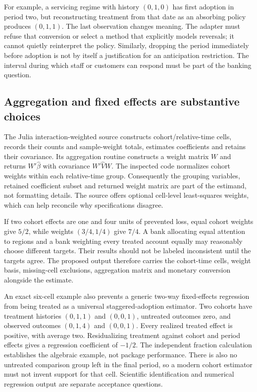 For example, a servicing regime with history $(0,1,0)$ has first adoption in
period two, but reconstructing treatment from that date as an absorbing policy
produces $(0,1,1)$. The last observation changes meaning. The adapter must
refuse that conversion or select a method that explicitly models reversals;
it cannot quietly reinterpret the policy. Similarly, dropping the period
immediately before adoption is not by itself a justification for an
anticipation restriction. The interval during which staff or customers
can respond must be part of the banking question.\citep{exec25_panelother_choice}

\subsection{Aggregation and fixed effects are substantive choices}
The Julia interaction-weighted source constructs cohort/relative-time cells,
records their counts and sample-weight totals, estimates coefficients and
retains their covariance. Its aggregation routine constructs a weight matrix
$W$ and returns $W'\widehat\beta$ with covariance $W'\widehat V W$.
The inspected code normalizes cohort weights within each relative-time group.
Consequently the grouping variables, retained coefficient subset and returned
weight matrix are part of the estimand, not formatting details. The source
offers optional cell-level least-squares weights, which can help reconcile
why specifications disagree.\citep{exec25_panelother_julia}

If two cohort effects are one and four units of prevented loss, equal cohort
weights give $5/2$, while weights $(3/4,1/4)$ give $7/4$. A bank allocating
equal attention to regions and a bank weighting every treated account equally
may reasonably choose different targets. Their results should not be labeled
inconsistent until the targets agree. The proposed output therefore carries
the cohort-time cells, weight basis, missing-cell exclusions, aggregation
matrix and monetary conversion alongside the estimate.\citep{exec25_panelother_choice}

An exact six-cell example also prevents a generic two-way fixed-effects
regression from being treated as a universal staggered-adoption estimator.
Two cohorts have treatment histories $(0,1,1)$ and $(0,0,1)$, untreated
outcomes zero, and observed outcomes $(0,1,4)$ and $(0,0,1)$. Every realized
treated effect is positive, with average two. Residualizing treatment against
cohort and period effects gives a regression coefficient of $-1/2$.
The independent fraction calculation establishes the algebraic example,
not package performance. There is also no untreated comparison group left
in the final period, so a modern cohort estimator must not invent support
for that cell. Scientific identification and numerical regression output
are separate acceptance questions.\citep{exec25_panelother_choice}

